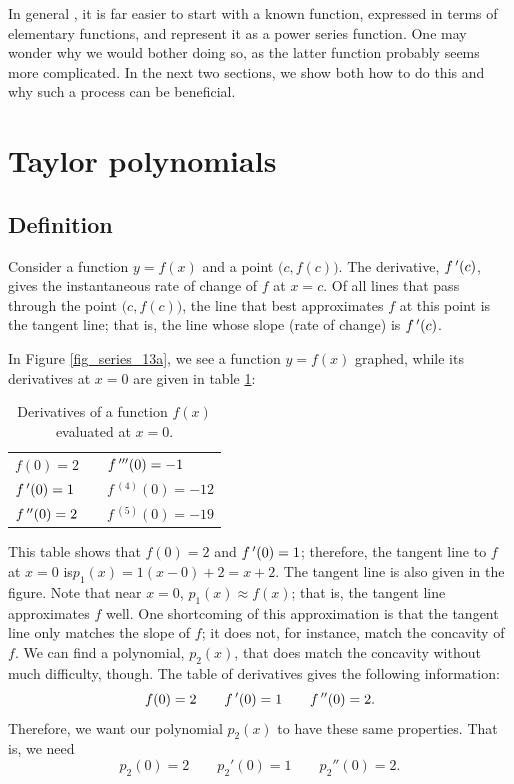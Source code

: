 In general , it is far easier to start with a known function, expressed in terms of elementary functions, and represent it as a power series function. One may wonder why we would bother doing so, as the latter function probably seems more complicated. In the next two sections, we show both how to do this and  why such a process can be beneficial. 


\section{Taylor polynomials}\label{sec:taylor_poly}
\subsection{Definition}
Consider a function $y=f(x)$ and a point $\big(c,f(c)\big)$. The derivative, $f\,'(c)$, gives the instantaneous rate of change of $f$ at $x=c$. Of all lines that pass through the point $\big(c,f(c)\big)$, the line that best approximates $f$ at this point is the tangent line; that is, the line whose slope (rate of change) is $f\,'(c)$.

In Figure \ref{fig_series_13a}, we see a function $y=f(x)$ graphed, while its derivatives at $x=0$ are given in table \ref{tab_series_0}:
\begin{table}[H]
\caption{Derivatives of a function $f(x)$ evaluated at $x=0$.}
\label{tab_series_0}
\begin{tabular}{|lll|}\hline
$f(0) = 2$ & &$f\,'''(0) = -1$\\%
$f\,'(0) = 1$ &&	$f\,^{(4)}(0)=-12$ \\%
$f\,''(0) = 2$ && $f\,^{(5)}(0)=-19$\\\hline
\end{tabular}
\end{table}

 This table shows that $f(0)=2$ and $f\,'(0) = 1$; therefore, the tangent line to $f$ at $x=0$ is\linebreak $p_1(x) = 1(x-0)+2 = x+2$. The tangent line is also given in the figure. Note that near $x=0$, $p_1(x) \approx f(x)$; that is, the tangent line approximates $f$ well. One shortcoming of this approximation is that the tangent line only matches the slope of $f$; it does not, for instance, match the concavity of $f$. We can find a polynomial, $p_2(x)$, that does match the concavity without much difficulty, though. The table of derivatives gives the following information:
$$f(0) = 2 \qquad f\,'(0) = 1\qquad f\,''(0) = 2.$$
Therefore, we want our polynomial $p_2(x)$ to have these same properties. That is, we need $$p_2(0) = 2 \qquad p_2'(0) = 1 \qquad p_2''(0) = 2.$$

